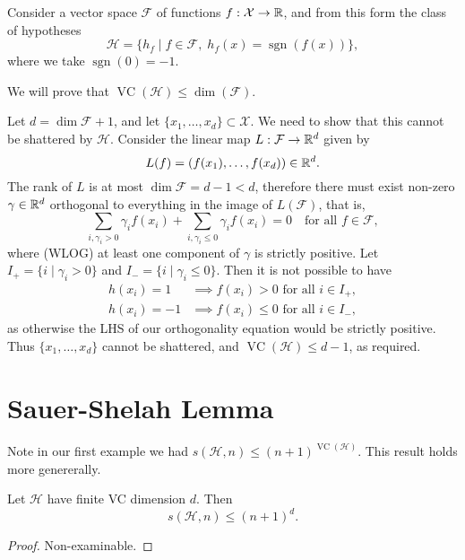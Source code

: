 \documentclass[a4paper]{amsart}
\begin{document}
\begin{example}
    Consider a vector space $\mathcal{F}$ of functions $f: \mathcal{X} \rightarrow \mathbb{R}$, and from this form the class of hypotheses
    $$
    \mathcal{H} = \{h_f \mid f \in \mathcal{F}, \; h_f(x) = \operatorname{sgn}(f(x)) \},
    $$
    where we take $\operatorname{sgn}(0) = -1$.

    We will prove that $\operatorname{VC}(\mathcal{H}) \leq \dim(\mathcal{F})$.

    Let $d = \dim \mathcal{F} + 1$, and let $\{x_1, \dots, x_d\} \subset \mathcal{X}$. We need to show that this cannot be shattered by $\mathcal{H}$. Consider the linear map $L: \mathcal{F} \rightarrow \mathbb{R}^d$ given by
    $$
L(f) = (f(x_1), \dots, f(x_d)) \in \mathbb{R}^d.
    $$
    The rank of $L$ is at most $\dim \mathcal{F} = d - 1 < d$, therefore there must exist non-zero $\gamma \in \mathbb{R}^d$ orthogonal to everything in the image of $L(\mathcal{F})$, that is,
    $$
    \sum_{i, \gamma_i >0} \gamma_i f(x_i) + \sum_{i, \gamma_i \leq 0} \gamma_i f(x_i) = 0 \quad \text{for all }f \in \mathcal{F},
    $$
    where (WLOG) at least one component of $\gamma$ is strictly positive. Let $I_+ = \{i \mid \gamma_i >0\}$ and $I_- = \{i \mid \gamma_i \leq 0\}$. Then it is not possible to have
    \begin{align*}
        h(x_i) = 1 &\implies f(x_i) > 0 \text{ for all }i \in I_+,\\
        h(x_i) = -1 &\implies f(x_i) \leq 0 \text{ for all }i \in I_-,
    \end{align*}
    as otherwise the LHS of our orthogonality equation would be strictly positive. Thus $\{x_1, \dots, x_d\}$ cannot be shattered, and $\operatorname{VC}(\mathcal{H}) \leq d - 1$, as required.
\end{example}


\section{Sauer-Shelah Lemma}

Note in our first example we had $s(\mathcal{H}, n) \leq (n + 1)^{\operatorname{VC}(\mathcal{H})}$. This result holds more genererally.

\begin{lemma*}
    Let $\mathcal{H}$ have finite VC dimension $d$. Then
    $$
s(\mathcal{H}, n) \leq (n + 1)^d.
    $$
\end{lemma*}
\begin{proof}
    Non-examinable.
\end{proof}



\end{document}
